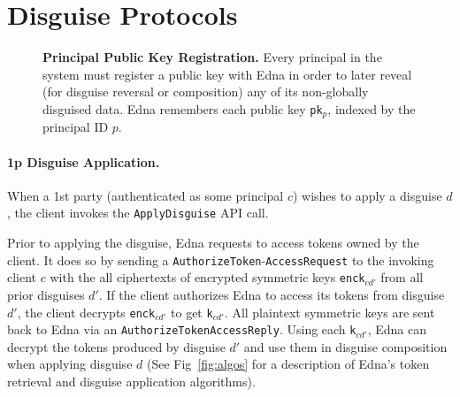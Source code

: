 \section{Disguise Protocols}

\begin{figure*}[h!]
\caption{
    \textbf{Principal Public Key Registration.}
Every principal in the system must register a public key with Edna in order to later reveal (for
disguise reversal or composition) any of its non-globally disguised data. Edna remembers each public key \texttt{pk}$_p$, indexed by the 
principal ID $p$.
}
\label{fig:acctreg}
\end{figure*}

\paragraph{1p Disguise Application.}
When a 1st party (authenticated as some principal $c$) wishes to apply a disguise $d$, the
client invokes the \texttt{ApplyDisguise} API call. 

Prior to applying the disguise, Edna requests to access tokens owned by the client. It does so by
sending a \texttt{AuthorizeToken}-\texttt{AccessRequest} to the invoking client $c$ with the all ciphertexts of 
encrypted symmetric keys \texttt{enck}$_{cd'}$ from all prior disguises $d'$. If the client
authorizes Edna to access its tokens from disguise $d'$, the client decrypts \texttt{enck}$_{cd'}$
to get \texttt{k}$_{cd'}$. All plaintext symmetric keys are sent back to Edna via an
\texttt{AuthorizeTokenAccessReply}. 
Using each \texttt{k}$_{cd'}$, Edna can decrypt the tokens produced by disguise $d'$ and use them
in disguise composition when applying disguise $d$ (See Fig~\ref{fig:algos} for a description of Edna's
token retrieval and disguise application algorithms).

